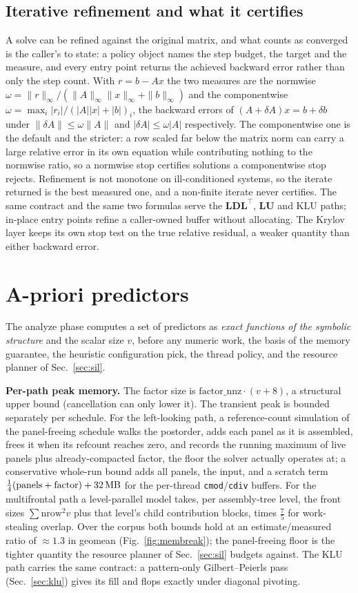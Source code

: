 \documentclass[11pt,a4paper]{article}
\newcommand{\code}[1]{\texttt{\small #1}}
\newcommand{\LDLt}{\mathbf{L}\mathbf{D}\mathbf{L}^{\!\top}}
\newcommand{\LU}{\mathbf{L}\mathbf{U}}
\begin{document}
\subsection{Iterative refinement and what it certifies}
\label{sec:refine}
A solve can be refined against the original matrix, and what counts as converged
is the caller's to state: a policy object names the step budget, the target
and the measure, and every entry point returns the achieved backward error
rather than only the step count. With $r=b-Ax$ the two measures are the normwise
$\omega=\|r\|_\infty/(\|A\|_\infty\|x\|_\infty+\|b\|_\infty)$ and the
componentwise $\omega=\max_i|r_i|/(|A||x|+|b|)_i$, the backward errors of
$(A+\delta A)x=b+\delta b$ under $\|\delta A\|\le\omega\|A\|$ and
$|\delta A|\le\omega|A|$ respectively. The componentwise one is the default and
the stricter: a row scaled far below the matrix norm can carry a large relative
error in its own equation while contributing nothing to the normwise ratio, so a
normwise stop certifies solutions a componentwise stop rejects. Refinement is not
monotone on ill-conditioned systems, so the iterate returned is the best measured
one, and a non-finite iterate never certifies. The same contract and the same two
formulas serve the $\LDLt$, $\LU$ and KLU paths; in-place entry points refine a
caller-owned buffer without allocating. The Krylov layer keeps its own stop test
on the true relative residual, a weaker quantity than either backward error.

\section{A-priori predictors}
\label{sec:pred}
The analyze phase computes a set of predictors as \emph{exact functions of the symbolic
structure} and the scalar size $v$, before any numeric work, the basis of the memory
guarantee, the heuristic configuration pick, the thread policy, and the resource planner of
Sec.~\ref{sec:sil}.

\textbf{Per-path peak memory.} The factor size is $\text{factor\_nnz}\cdot(v+8)$, a
structural upper bound (cancellation can only lower it). The transient peak is bounded
separately per schedule. For the left-looking path, a reference-count simulation of the
panel-freeing schedule walks the postorder, adds each panel as it is assembled, frees it
when its refcount reaches zero, and records the running maximum of live panels plus
already-compacted factor, the floor the solver actually operates at; a conservative
whole-run bound adds all panels, the input, and a scratch term
$\tfrac14(\text{panels}+\text{factor})+\SI{32}{\mega\byte}$ for the per-thread
\code{cmod}/\code{cdiv} buffers. For the multifrontal path a level-parallel model takes,
per assembly-tree level, the front sizes $\sum\text{nrow}^2v$ plus that level's child
contribution blocks, times $\tfrac75$ for work-stealing overlap. Over the corpus both
bounds hold at an estimate/measured ratio of $\approx1.3$ in geomean
(Fig.~\ref{fig:membreak}); the panel-freeing floor is the tighter quantity the
resource planner of Sec.~\ref{sec:sil} budgets against. The KLU path carries the same contract: a pattern-only
Gilbert--Peierls pass (Sec.~\ref{sec:klu}) gives its fill and flops exactly under
diagonal pivoting.
\end{document}
